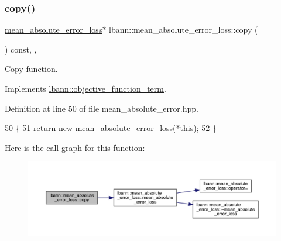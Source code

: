 \subsubsection{\texorpdfstring{copy()}{copy()}}
{\footnotesize\ttfamily \hyperlink{classlbann_1_1mean__absolute__error__loss}{mean\+\_\+absolute\+\_\+error\+\_\+loss}$\ast$ lbann\+::mean\+\_\+absolute\+\_\+error\+\_\+loss\+::copy (\begin{DoxyParamCaption}{ }\end{DoxyParamCaption}) const\hspace{0.3cm}{\ttfamily [inline]}, {\ttfamily [override]}, {\ttfamily [virtual]}}

Copy function. 

Implements \hyperlink{classlbann_1_1objective__function__term_ae98a4ec173a602ad55d1df20dadd4cb9}{lbann\+::objective\+\_\+function\+\_\+term}.



Definition at line 50 of file mean\+\_\+absolute\+\_\+error.\+hpp.


\begin{DoxyCode}
50                                                   \{
51     \textcolor{keywordflow}{return} \textcolor{keyword}{new} \hyperlink{classlbann_1_1mean__absolute__error__loss_a80845866345cf8c4daba645683022bc2}{mean\_absolute\_error\_loss}(*\textcolor{keyword}{this});
52   \}
\end{DoxyCode}
Here is the call graph for this function\+:\nopagebreak
\begin{figure}[H]
\begin{center}
\leavevmode
\includegraphics[width=350pt]{classlbann_1_1mean__absolute__error__loss_aae4bf8c6a5986ae3895b4900f961fd77_cgraph}
\end{center}
\end{figure}
\mbox{\label{classlbann_1_1mean__absolute__error__loss_af1d8c8bacc959273f9f54eafbe5c1f7d}} 
